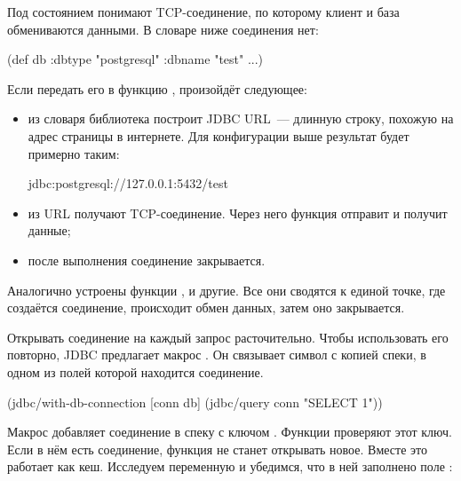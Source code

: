 Под состоянием понимают TCP-соединение, по которому клиент и база обмениваются данными. В словаре ниже соединения нет:

\begin{english}
  \begin{clojure}
(def db {:dbtype "postgresql"
         :dbname "test"
         ...})
  \end{clojure}
\end{english}

Если передать его в функцию , произойдёт следующее:

\begin{itemize}

\item
  из словаря библиотека построит JDBC URL~--- длинную строку, похожую на адрес страницы в интернете. Для конфигурации выше результат будет примерно таким:

\begin{english}
  \begin{text}
jdbc:postgresql://127.0.0.1:5432/test
  \end{text}
\end{english}

\item
  из URL получают TCP-соединение. Через него функция  отправит и получит данные;

\item
  после выполнения  соединение закрывается.

\end{itemize}


Аналогично устроены функции ,  и другие. Все они сводятся к единой точке, где создаётся соединение, происходит обмен данных, затем оно закрывается.

Открывать соединение на каждый запрос расточительно. Чтобы использовать его повторно, JDBC предлагает макрос . Он связывает символ с копией спеки, в одном из полей которой находится соединение.

\begin{english}
  \begin{clojure}
(jdbc/with-db-connection
  [conn db]
  (jdbc/query conn "SELECT 1"))
  \end{clojure}
\end{english}

Макрос добавляет соединение в спеку с ключом . Функции проверяют этот ключ. Если в нём есть соединение, функция не станет открывать новое. Вместе это работает как кеш. Исследуем переменную  и убедимся, что в ней заполнено поле  :

